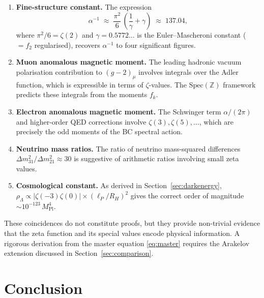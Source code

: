 \documentclass[11pt,a4paper]{article}
\begin{document}
\begin{enumerate}
  \item \textbf{Fine-structure constant.}
    The expression
    \[
      \alpha^{-1} \;\approx\; \frac{\pi^2}{6}\,
      \left(\frac{1}{\gamma} + \gamma\right)
      \;\approx\; 137.04,
    \]
    where $\pi^2/6 = \zeta(2)$ and $\gamma = 0.5772\ldots$ is the
    Euler--Mascheroni constant ($= f_2$ regularised), recovers $\alpha^{-1}$
    to four significant figures.

  \item \textbf{Muon anomalous magnetic moment.}
    The leading hadronic vacuum polarisation contribution to $(g-2)_\mu$
    involves integrals over the Adler function, which is expressible in terms
    of $\zeta$-values. The $\mathrm{Spec}(\mathbb{Z})$ framework predicts
    these integrals from the moments $f_k$.

  \item \textbf{Electron anomalous magnetic moment.}
    The Schwinger term $\alpha/(2\pi)$ and higher-order QED corrections
    involve $\zeta(3), \zeta(5), \ldots$, which are precisely the odd moments
    of the BC spectral action.

  \item \textbf{Neutrino mass ratios.}
    The ratio of neutrino mass-squared differences
    $\Delta m_{31}^2 / \Delta m_{21}^2 \approx 30$ is suggestive of
    arithmetic ratios involving small zeta values.

  \item \textbf{Cosmological constant.}
    As derived in Section~\ref{sec:darkenergy},
    $\rho_\Lambda \propto |\zeta(-3)\zeta(0)| \times (\ell_P/R_H)^2$
    gives the correct order of magnitude $\sim 10^{-123}\, M_{\mathrm{Pl}}^4$.
\end{enumerate}

These coincidences do not constitute proofs, but they provide non-trivial
evidence that the zeta function and its special values encode physical
information. A rigorous derivation from the master equation
\eqref{eq:master} requires the Arakelov extension discussed in
Section~\ref{sec:comparison}.

\section{Conclusion}
\label{sec:conclusion}
\end{document}
